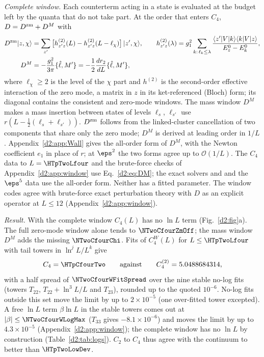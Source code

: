 \emph{Complete window.} Each counterterm acting in a state is evaluated at the budget left by the quanta that do not take
part. At the order that enters $C_4$, $D=D^{\rm zm}+D^M$ with
\begin{align}
 D^{\rm zm}|z,\chi\rangle&=\sum_{z'}\big[h^{(2)}_{z'z}(L)-h^{(2)}_{z'z}(L-\ell_\chi)\big]\,|z',\chi\rangle,\qquad
 h^{(2)}_{z'z}(\lambda)=g_1^2\sum_{k:\,\ell_k\le \lambda}\frac{\langle z'|V|k\rangle\langle k|V|z\rangle}{E^0_z-E^0_k},\label{d2:eq:Dzm}\\
 D^M&=-\frac{g_1^2}{3\pi}\{\hat\ell,M'\}=-\frac12\frac{dr_2}{dL}\{\hat\ell,M'\} ,\label{d2:eq:DM}
\end{align}
where $\ell_\chi\ge2$ is the level of the $\chi$ part and $h^{(2)}$ is the second-order effective interaction of the zero mode, a
matrix in $z$ in its ket-referenced (Bloch) form; its diagonal contains the consistent and zero-mode windows. The mass
window $D^M$ makes a mass insertion between states of levels $\ell_s$, $\ell_{s'}$ use $r(L-\frac12(\ell_s+\ell_{s'}))$. $D^{\rm zm}$ follows from
the linked-cluster cancellation of two components that share only the zero mode; $D^M$ is derived at leading order in $1/L$.
Appendix~\ref{d2:app:Wall} gives the all-order form of $D^M$, with the Newton coefficient $e_1$ in place of $r$; at $\eps^2$
the two forms agree up to $\mathcal O(1/L)$. The $C_4$ data to $L=\HTpTwoLfour$ and the brute-force checks of
Appendix~\ref{d2:app:window} use Eq.~\eqref{d2:eq:DM}; the exact solvers  and  and the
$\eps^5$ data use the all-order form.
Neither has a fitted parameter. The window codes agree with brute-force exact perturbation theory with $D$ as an explicit
operator at $L\le12$ (Appendix~\ref{d2:app:window}).

\emph{Result.} With the complete window $C_4(L)$ has no $\ln L$ term (Fig.~\ref{d2:fig}a). The full zero-mode window alone
tends to $\NTwoCfourZmOff$; the mass window $D^M$ adds the missing $\NTwoCfourChi$. Fits of $C_4^W(L)$ for
$L\le\HTpTwoLfour$ with tail towers in $\ln^jL/L^k$ give
\begin{equation}
 C_4=\HTpCfourTwo\qquad\text{against}\qquad C_4^{(2)}=5.0488684314 ,
 \label{d2:eq:C4}
\end{equation}
with a half spread of $\NTwoCfourWFitSpread$ over the nine stable no-log fits (towers $T_{22}$, $T_{22}+\ln^3L/L$ and
$T_{23}$), rounded up to the quoted $10^{-6}$. No-log fits outside this set move the limit by up to $2\times10^{-5}$ (one
over-fitted tower excepted). A free $\ln L$ term $\beta\ln L$ in the stable towers comes out at
$|\beta|\le\NTwoCfourWLogMax$ ($T_{33}$ gives $-8.1\times10^{-6}$) and moves the limit by up to $4.3\times10^{-5}$
(Appendix~\ref{d2:app:window}); the complete window has no $\ln L$ by construction (Table~\ref{d2:tab:logs}). $C_2$ to $C_4$ thus agree
with the continuum to better than $\HTpTwoLowDev$.

